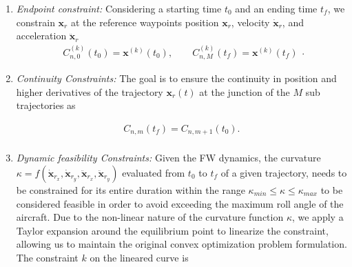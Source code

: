 \begin{enumerate}
    \renewcommand{\labelenumi}{\roman{enumi}.}
    \item \textit{Endpoint constraint:}
    Considering a starting time $t_0$ and an ending time $t_{f}$, we constrain $\mathbf{x}_{r}$ at the reference waypoints position $\mathbf{x}_{r}$, velocity $\dot{\mathbf{x}}_{r}$, and acceleration $\ddot{\mathbf{x}}_{r}$
     \begin{equation}\begin{aligned}
        C_{n,0}^{(k)}(t_0) = \mathbf{x}^{(k)}(t_0), \qquad C_{n,M}^{(k)}(t_f) = \mathbf{x}^{(k)}(t_f) 
    \end{aligned}.\end{equation}

    \item \textit{Continuity Constraints:}
    The goal is to ensure the continuity in position and higher derivatives of the trajectory $\mathbf{x}_r(t)$ at the junction of the $M$ sub trajectories as


    \begin{equation}\begin{aligned}
        C_{n,m}(t_{f}) = C_{n,m+1}(t_{{0}}). \\
    \end{aligned}\end{equation}



    
    \item \textit{Dynamic feasibility Constraints:}
    Given the FW dynamics, the curvature $\kappa = f(\dot{\mathbf{x}}_{r_x}, \dot{\mathbf{x}}_{r_y}, \ddot{\mathbf{x}}_{r_x}, \ddot{\mathbf{x}}_{r_y})$ evaluated from $t_0$ to $t_f$ of a given trajectory, needs to be constrained for its entire duration within the range  $\kappa_{min} \leq \kappa \leq \kappa_{max}$ to be considered feasible in order to avoid exceeding the maximum roll angle of the aircraft. Due to the non-linear nature of the curvature function $\kappa$, we apply a Taylor expansion around the equilibrium point to linearize the constraint, allowing us to maintain the original convex optimization problem formulation. The constraint  $k$ on the lineared curve is
    

\end{enumerate}
